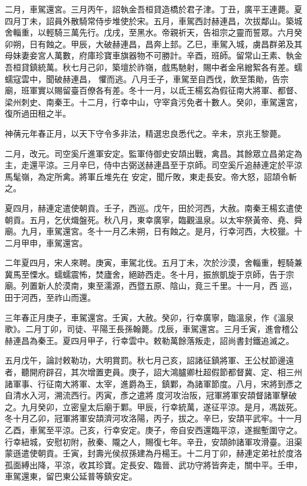 \begin{pinyinscope}
 二月，車駕還宮。三月丙午，詔執金吾桓貸造橋於君子津。丁丑，廣平王連薨。夏四月丁未，詔員外散騎常侍步堆使於宋。五月，車駕西討赫連昌，次拔鄰山。築城舍輜重，以輕騎三萬先行。戊戌，至黑水。帝親祈天，告祖宗之靈而誓眾。六月癸卯朔，日有蝕之。甲辰，大破赫連昌，昌奔上邽。乙巳，車駕入城，虜昌群弟及其母妹妻妾宮人萬數，府庫珍寶車旗器物不可勝計。辛酉，班師。留常山王素、執金吾桓貸鎮統萬。秋七月己卯，築壇於祚嶺，戲馬馳射，賜中者金帛繒絮各有差。蠕蠕寇雲中，聞破赫連昌，
 懼而逃。八月壬子，車駕至自西伐，飲至策勛，告宗廟，班軍實以賜留臺百僚各有差。冬十一月，以氐王楊玄為假征南大將軍、都督、梁州刺史、南秦王。十二月，行幸中山，守宰貪污免者十數人。癸卯，車駕還宮，復所過田租之半。



 神蒨元年春正月，以天下守令多非法，精選忠良悉代之。辛未，京兆王黎薨。



 二月，改元。司空奚斤進軍安定。監軍侍御史安頡出戰，禽昌。其餘眾立昌弟定為主，走還平涼。三月辛巳，侍中古弼送赫連昌至于京師。司空奚斤追赫連定於平涼馬髦嶺，為定所禽。將軍丘堆先在
 安定，聞斤敗，東走長安。帝大怒，詔頡令斬之。



 夏四月，赫連定遣使朝貢。壬子，西巡。戊午，田於河西，大赦。南秦王楊玄遣使朝貢。五月，乞伏熾盤死。秋八月，東幸廣寧，臨觀溫泉。以太牢祭黃帝、堯、舜廟。九月，車駕還宮。冬十一月乙未朔，日有蝕之。是月，行幸河西，大校獵。十二月甲申，車駕還宮。



 二年夏四月，宋人來聘。庚寅，車駕北伐。五月丁未，次於沙漠，舍輜重，輕騎兼冀馬至慄水。蠕蠕震怖，焚廬舍，絕跡西走。冬十月，振旅凱旋于京師，告于宗廟。列置新人於漠南，東至濡源，西暨五原、陰山，竟三千里。十一月，西
 巡，田于河西，至祚山而還。



 三年春正月庚子，車駕還宮。壬寅，大赦。癸卯，行幸廣寧，臨溫泉，作《溫泉歌》。二月丁卯，司徒、平陽王長孫翰薨。戊辰，車駕還宮。三月壬寅，進會稽公赫連昌為秦王。夏四月甲子，行幸雲中。敕勒萬餘落叛走，詔尚書封鐵追滅之。



 五月戊午，論討敕勒功，大明賞罰。秋七月己亥，詔諸征鎮將軍、王公杖節邊遠者，聽開府辟召，其次增置吏員。庚子，詔大鴻臚卿杜超假節都督冀、定、相三州諸軍事、行征南大將軍、太宰，進爵為王，鎮鄴，為諸軍節度。八月，宋將到彥之自清水入河，溯流西行。丙寅，彥之遣將
 度河攻治阪，冠軍將軍安頡督諸軍擊破之。九月癸卯，立密皇太后廟于鄴。甲辰，行幸統萬，遂征平涼。是月，馮跋死。冬十月乙卯，冠軍將軍安頡濟河攻洛陽，丙子，拔之。辛巳，安頡平武牢。十一月乙酉，車駕至平涼。己亥，行幸安定。庚子，帝自安西還臨平涼，遂掘塹圍守之。行幸紐城，安慰初附，赦秦、隴之人，賜復七年。辛丑，安頡帥諸軍攻滑臺。沮渠蒙遜遣使朝貢。壬寅，封壽光侯叔孫建為丹楊王。十二月丁卯，赫連定弟社於度洛孤面縛出降，平涼，收其珍寶。定長安、臨晉、武功守將皆奔走，關中平。壬申，車駕還東，留巴東公延普等鎮安定。




\end{pinyinscope}
